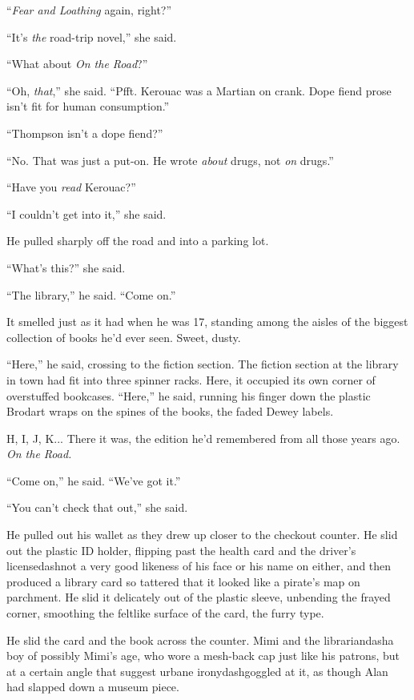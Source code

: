 ``\textit{Fear and Loathing} again, right?''

``It's \textit{the} road-trip novel,'' she said.

``What about \textit{On the Road}?''

``Oh, \textit{that},'' she said.  ``Pfft.  Kerouac was a Martian on
crank.  Dope fiend prose isn't fit for human consumption.''

``Thompson isn't a dope fiend?''

``No.  That was just a put-on.  He wrote \textit{about} drugs, not
\textit{on} drugs.''

``Have you \textit{read} Kerouac?''

``I couldn't get into it,'' she said.

He pulled sharply off the road and into a parking lot.

``What's this?'' she said.

``The library,'' he said.  ``Come on.''

It smelled just as it had when he was 17, standing among the aisles of
the biggest collection of books he'd ever seen.  Sweet, dusty.

``Here,'' he said, crossing to the fiction section.  The fiction
section at the library in town had fit into three spinner racks. 
Here, it occupied its own corner of overstuffed bookcases.  ``Here,''
he said, running his finger down the plastic Brodart wraps on the
spines of the books, the faded Dewey labels.

H, I, J, K...  There it was, the edition he'd remembered from all
those years ago.  \textit{On the Road.}

``Come on,'' he said.  ``We've got it.''

``You can't check that out,'' she said.

He pulled out his wallet as they drew up closer to the checkout
counter.  He slid out the plastic ID holder, flipping past the health
card and the driver's licensedash{}not a very good likeness of his face
or his name on either, and then produced a library card so tattered
that it looked like a pirate's map on parchment.  He slid it
delicately out of the plastic sleeve, unbending the frayed corner,
smoothing the feltlike surface of the card, the furry type.

He slid the card and the book across the counter.  Mimi and the
librariandash{}a boy of possibly Mimi's age, who wore a mesh-back cap
just like his patrons, but at a certain angle that suggest urbane
ironydash{}goggled at it, as though Alan had slapped down a museum piece.

